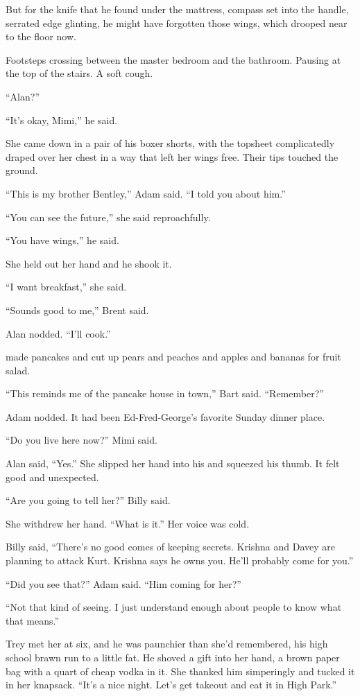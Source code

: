 But for the knife that he found under the mattress, compass set into
the handle, serrated edge glinting, he might have forgotten those
wings, which drooped near to the floor now. 

Footsteps crossing between the master bedroom and the bathroom. 
Pausing at the top of the stairs.  A soft cough.

``Alan?''

``It's okay, Mimi,'' he said. 

She came down in a pair of his boxer shorts, with the topsheet
complicatedly draped over her chest in a way that left her wings free. 
Their tips touched the ground.

``This is my brother Bentley,'' Adam said.  ``I told you about him.''

``You can see the future,'' she said reproachfully.

``You have wings,'' he said.

She held out her hand and he shook it.

``I want breakfast,'' she said. 

``Sounds good to me,'' Brent said. 

Alan nodded.  ``I'll cook.''

 made pancakes and cut up pears and peaches and apples and bananas
for fruit salad. 

``This reminds me of the pancake house in town,'' Bart said. 
``Remember?''

Adam nodded.  It had been Ed-Fred-George's favorite Sunday dinner
place.

``Do you live here now?'' Mimi said.

Alan said, ``Yes.'' She slipped her hand into his and squeezed his
thumb.  It felt good and unexpected.

``Are you going to tell her?'' Billy said. 

She withdrew her hand.  ``What is it.'' Her voice was cold.

Billy said, ``There's no good comes of keeping secrets.  Krishna and
Davey are planning to attack Kurt.  Krishna says he owns you.  He'll
probably come for you.''

``Did you see that?'' Adam said.  ``Him coming for her?''

``Not that kind of seeing.  I just understand enough about people to
know what that means.''

Trey met her at six, and he was paunchier than she'd remembered, his
high school brawn run to a little fat.  He shoved a gift into her
hand, a brown paper bag with a quart of cheap vodka in it.  She
thanked him simperingly and tucked it in her knapsack.  ``It's a nice
night.  Let's get takeout and eat it in High Park.''

